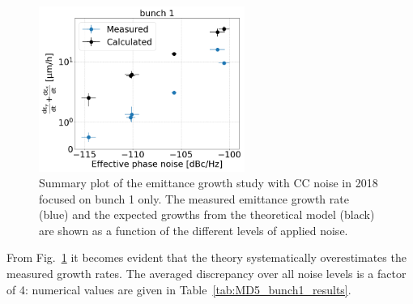 \begin{figure}[!h]
   \centering         
   \includegraphics[width=0.6\textwidth]{images/Ch5/MD5_summary_bunch1_backg_subtracted_vs_theory.png}
       \caption{Summary plot of the emittance growth study with CC noise in 2018 focused on bunch 1 only. The measured emittance growth rate (blue) and the expected growths from the theoretical model (black) are shown as a function of the different levels of applied noise.}
       \label{fig:MD5_bunch1_theory_vs_meas}
\end{figure}


From Fig.~\ref{fig:MD5_bunch1_theory_vs_meas} it becomes evident that the theory systematically overestimates the measured growth rates. The averaged discrepancy over all noise levels is a factor of 4: numerical values are given in Table~\ref{tab:MD5_bunch1_results}.


